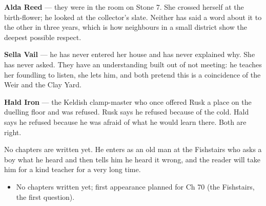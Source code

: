 \documentclass{design/chronicle}
\begin{document}
{\textbf{Alda Reed} — they were in the room on Stone 7. She crossed herself at the birth-flower; he looked at the collector’s slate. Neither has said a word about it to the other in three years, which is how neighbours in a small district show the deepest possible respect.

\textbf{Sella Vail} — he has never entered her house and has never explained why. She has never asked. They have an understanding built out of not meeting: he teaches her foundling to listen, she lets him, and both pretend this is a coincidence of the Weir and the Clay Yard.

\textbf{Hald Iron} — the Keldish clamp-master who once offered Rusk a place on the duelling floor and was refused. Rusk says he refused because of the cold. Hald says he refused because he was afraid of what he would learn there. Both are right.

No chapters are written yet. He enters as an old man at the Fishstairs who asks a boy what he heard and then tells him he heard it wrong, and the reader will take him for a kind teacher for a very long time.

\begin{itemize}[leftmargin=1.4em,itemsep=1pt,topsep=3pt,parsep=0pt]

\item No chapters written yet; first appearance planned for Ch 70 (the Fishstairs, the first question).

\end{itemize}
}
\end{document}

